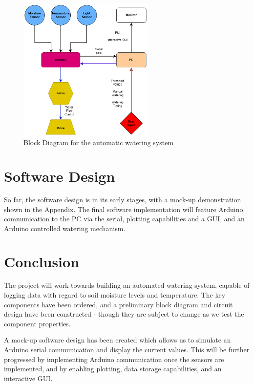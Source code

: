 \documentclass[a4paper,11pt]{article}
\begin{document}
\begin{figure}[H]
    \centering
    \includegraphics[width=0.6\textwidth]{DataLogger Block Diagram2.png}
    \caption{Block Diagram for the automatic watering system}
    \label{fig:Block_Diagram_for_the_automatic_watering_system}
\end{figure}

\section{Software Design}
\label{sec:Software_Design}


So far, the software design is in its early stages,
with a mock-up demonstration shown in the Appendix.
The final software implementation will feature 
Arduino communication to the PC via the serial,
plotting capabilities and a GUI,
and an Arduino controlled watering mechanism.

\section{Conclusion}
\label{sec:Conclusion}

The project will work towards building an automated watering system,
capable of logging data with regard to soil moisture levels and temperature.
The key components have been ordered, 
and a preliminary block diagram and circuit design have been constructed - 
though they are subject to change as we test the component properties.

A mock-up software design has been created which allows us to 
simulate an Arduino serial communication and display the current values.
This will be further progressed by implementing 
Arduino communication once the sensors are implemented,
and by enabling plotting, data storage capabilities, and an interactive GUI.
\end{document}
